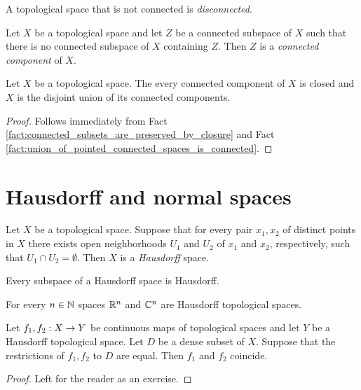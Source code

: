 \begin{definition}
	A topological space that is not connected is \textit{disconnected}.
\end{definition}

\begin{definition}
	Let $X$ be a topological space and let $Z$ be a connected subspace of $X$ such that there is no connected subspace of $X$ containing $Z$. Then $Z$ is a \textit{connected component} of $X$.
\end{definition}

\begin{corollary}\label{corollary:space_is_a_union_of_its_connected_components_which_are_closed}
	Let $X$ be a topological space. The every connected component of $X$ is closed and $X$ is the disjoint union of its connected components.
\end{corollary}
\begin{proof}
	Follows immediately from Fact \ref{fact:connected_subsets_are_preserved_by_closure} and Fact \ref{fact:union_of_pointed_connected_spaces_is_connected}.
\end{proof}

\section{Hausdorff and normal spaces}

\begin{definition}
	Let $X$ be a topological space. Suppose that for every pair $x_1,x_2$ of distinct points in $X$ there exists open neighborhoods $U_1$ and $U_2$ of $x_1$ and $x_2$, respectively, such that $U_1\cap U_2 =\emptyset$. Then $X$ is a \textit{Hausdorff} space.
\end{definition}

\begin{remark}\label{remark:each_subspace_of_Hausdorff_space_is_Hausdorff}
	Every subspace of a Hausdorff space is Hausdorff.
\end{remark}

\begin{example}\label{example:real_and_complex_affine_spaces_are_Hausdorff_for_natural_topology}
	For every $n \in {\mathbb N}$ spaces ${\mathbb R}^n$ and ${\mathbb C}^n$ are Hausdorff topological spaces.
\end{example}

\begin{fact}\label{fact:continuous_functions_that_coincide_on_dense_subsets_and_have_Hausdorff_targets_are_equal}
	Let $f_1,f_2:X\rightarrow Y$ be continuous maps of topological spaces and let $Y$ be a Hausdorff topological space. Let $D$ be a dense subset of $X$. Suppose that the restrictions of $f_1, f_2$ to $D$ are equal. Then $f_1$ and $f_2$ coincide.
\end{fact}
\begin{proof}
	Left for the reader as an exercise.
\end{proof}

